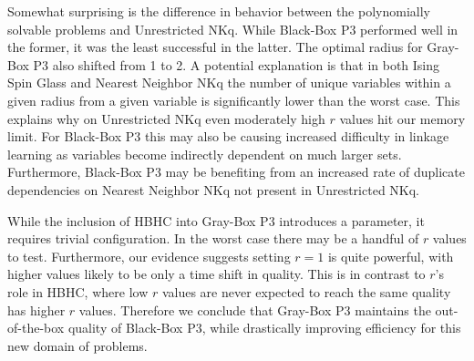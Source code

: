 Somewhat surprising is the difference in behavior between the polynomially solvable problems
and Unrestricted NKq. While Black-Box P3 performed well in the former, it was the least
successful in the latter. The optimal radius for Gray-Box P3 also shifted from 1 to 2.
A potential explanation is that in both Ising Spin Glass
and Nearest Neighbor NKq 
the number of unique variables within a given radius
from a given variable is significantly lower than
the worst case.
%
This explains why on Unrestricted NKq
even moderately high $r$ values hit our memory limit.
For Black-Box P3 this may also be causing increased difficulty in linkage learning as variables
become indirectly dependent on much larger sets. Furthermore, Black-Box
P3 may be benefiting from an increased rate of duplicate dependencies on Nearest Neighbor NKq
not present in Unrestricted NKq.

While the inclusion of HBHC into Gray-Box P3 introduces a parameter, it requires
trivial configuration. In the worst case there may be a handful of $r$ values to test.
Furthermore, our evidence suggests setting $r=1$ is quite powerful, with higher values
likely to be only a time shift in quality. This is in contrast to $r$'s role in HBHC,
where low $r$ values are never expected to reach the same quality has higher $r$ values.
Therefore we conclude that Gray-Box P3 maintains the out-of-the-box quality of Black-Box
P3, while drastically improving efficiency for this new domain of problems.
